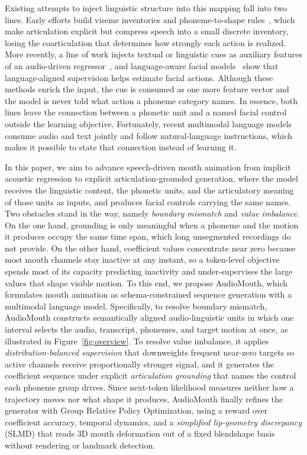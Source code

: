 Existing attempts to inject linguistic structure into this mapping fall into two lines. Early efforts build viseme inventories and phoneme-to-shape rules~\citep{cohen1993modeling,edwards2016jali,taylor2017deep,zhou2018visemenet}, which make articulation explicit but compress speech into a small discrete inventory, losing the coarticulation that determines how strongly each action is realized. More recently, a line of work injects textual or linguistic cues as auxiliary features of an audio-driven regressor~\citep{fan2022joint,xu2024kmtalk}, and language-aware facial models~\citep{kang2026semanticface,wu2025keyframeface} show that language-aligned supervision helps estimate facial actions. Although these methods enrich the input, the cue is consumed as one more feature vector and the model is never told what action a phoneme category names. In essence, both lines leave the connection between a phonetic unit and a named facial control outside the learning objective. Fortunately, recent multimodal language models~\citep{xu2025qwen3omni} consume audio and text jointly and follow natural-language instructions, which makes it possible to state that connection instead of learning it.

In this paper, we aim to advance speech-driven mouth animation from implicit acoustic regression to explicit articulation-grounded generation, where the model receives the linguistic content, the phonetic units, and the articulatory meaning of those units as inputs, and produces facial controls carrying the same names. Two obstacles stand in the way, namely \emph{boundary mismatch} and \emph{value imbalance}. On the one hand, grounding is only meaningful when a phoneme and the motion it produces occupy the same time span, which long unsegmented recordings do not provide. On the other hand, coefficient values concentrate near zero because most mouth channels stay inactive at any instant, so a token-level objective spends most of its capacity predicting inactivity and under-supervises the large values that shape visible motion. To this end, we propose AudioMouth, which formulates mouth animation as schema-constrained sequence generation with a multimodal language model. Specifically, to resolve boundary mismatch, AudioMouth constructs semantically aligned audio-linguistic units in which one interval selects the audio, transcript, phonemes, and target motion at once, as illustrated in Figure~\ref{fig:overview}. To resolve value imbalance, it applies \emph{distribution-balanced supervision} that downweights frequent near-zero targets so active channels receive proportionally stronger signal, and it generates the coefficient sequence under explicit \emph{articulation grounding} that names the control each phoneme group drives. Since next-token likelihood measures neither how a trajectory moves nor what shape it produces, AudioMouth finally refines the generator with Group Relative Policy Optimization, using a reward over coefficient accuracy, temporal dynamics, and a \emph{simplified lip-geometry discrepancy} (SLMD) that reads 3D mouth deformation out of a fixed blendshape basis without rendering or landmark detection.

